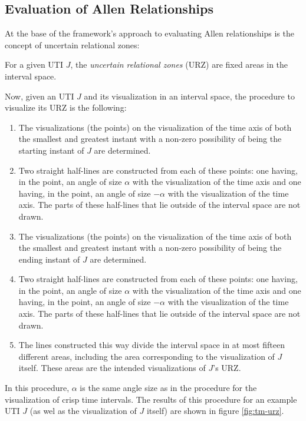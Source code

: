 \subsection{\label{subsec:tm-evaluation}Evaluation of Allen Relationships}
At the base of the framework's approach to evaluating Allen relationships is the concept of uncertain relational zones:

\begin{definition}
For a given UTI $J$, the \emph{uncertain relational zones} (URZ) are fixed areas in the interval space.
\end{definition}

Now, given an UTI $J$ and its visualization in an interval space, the procedure to visualize its URZ is the following:

\begin{enumerate}
	\item The visualizations (the points) on the visualization of the time axis of both the smallest and greatest instant with a non-zero possibility of being the starting instant of $J$ are determined.
	\item Two straight half-lines are constructed from each of these points: one having, in the point, an angle of size $\alpha$ with the visualization of the time axis and one having, in the point, an angle of size $-\alpha$ with the visualization of the time axis. The parts of these half-lines that lie outside of the interval space are not drawn.
	\item The visualizations (the points) on the visualization of the time axis of both the smallest and greatest instant with a non-zero possibility of being the ending instant of $J$ are determined.
	\item Two straight half-lines are constructed from each of these points: one having, in the point, an angle of size $\alpha$ with the visualization of the time axis and one having, in the point, an angle of size $-\alpha$ with the visualization of the time axis. The parts of these half-lines that lie outside of the interval space are not drawn.
	\item The lines constructed this way divide the interval space in at most fifteen different areas, including the area corresponding to the visualization of $J$ itself. These areas are the intended visualizations of $J$'s URZ.
\end{enumerate}

In this procedure, $\alpha$ is the same angle size as in the procedure for the visualization of crisp time intervals. The results of this procedure for an example UTI $J$ (as wel as the visualization of $J$ itself) are shown in figure \ref{fig:tm-urz}. 

